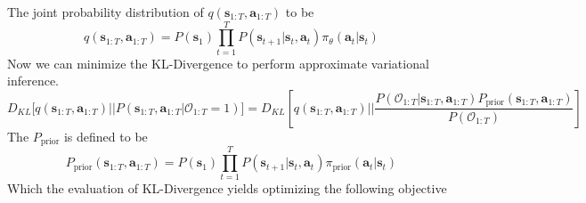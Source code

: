 The joint probability distribution of $q(\boldsymbol{s}_{1:T}, \boldsymbol{a}_{1:T})$ to be 
\begin{equation}
    q(\boldsymbol{s}_{1:T}, \boldsymbol{a}_{1:T}) = P(\boldsymbol{s}_1)\prod^T_{t=1} P(\boldsymbol{s}_{t+1} | \boldsymbol{s}_t, \boldsymbol{a}_t) \pi_{\theta}(\boldsymbol{a}_t | \boldsymbol{s}_t)
\end{equation}
Now we can minimize the KL-Divergence to perform approximate variational inference.
\begin{equation}
        D_{KL} \Big[ q(\boldsymbol{s}_{1:T}, \boldsymbol{a}_{1:T}) \Big\lvert\Big\rvert P(\boldsymbol{s}_{1:T}, \boldsymbol{a}_{1:T} | \mathcal{O}_{1:T} = 1) \Big] = D_{KL} \left[ q(\boldsymbol{s}_{1:T}, \boldsymbol{a}_{1:T}) \Bigg\lvert\Bigg\rvert \frac{P(\mathcal{O}_{1:T} | \boldsymbol{s}_{1:T}, \boldsymbol{a}_{1:T}) P_{\text{prior}} (\boldsymbol{s}_{1:T}, \boldsymbol{a}_{1:T}) }{P(\mathcal{O}_{1:T})} \right]
\end{equation}
The $P_{\text{prior}}$ is defined to be 
\begin{equation}
    P_{\text{prior}}(\boldsymbol{s}_{1:T}, \boldsymbol{a}_{1:T}) = P(\boldsymbol{s}_1)\prod^T_{t=1} P(\boldsymbol{s}_{t+1} | \boldsymbol{s}_t, \boldsymbol{a}_t) \pi_{\text{prior}}(\boldsymbol{a}_t | \boldsymbol{s}_t)
\end{equation}
Which the evaluation of KL-Divergence yields optimizing the following objective
